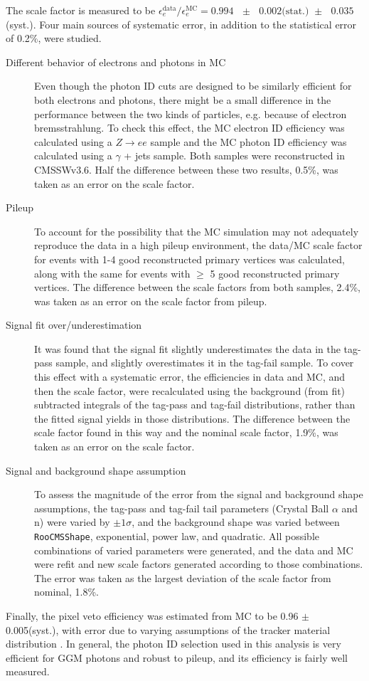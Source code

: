\documentclass[dissertation.tex]{subfiles}
\begin{document}
\marginpar{\textcolor{blue}{Official result uses this syst. error, so I am not rechecking it}}The scale factor is measured to be $\epsilon_{e}^{\mathrm{data}}/\epsilon_{e}^{\mathrm{MC}} = 0.994\mbox{ }\pm\mbox{ }0.002\mbox{(stat.) }\pm\mbox{ }0.035$(syst.).  Four main sources of systematic error, in addition to the statistical error of 0.2\%, were studied.

\begin{description}
  \item[Different behavior of electrons and photons in MC] Even though the photon ID cuts are designed to be similarly efficient for both electrons and photons, there might be a small difference in the performance between the two kinds of particles, e.g. because of electron bremsstrahlung.  To check this effect, the MC electron ID efficiency was calculated using a $Z\rightarrow ee$ sample and the MC photon ID efficiency was calculated using a $\gamma$ + jets sample.  Both samples were reconstructed in CMSSWv3.6.  Half the difference between these two results, 0.5\%, was taken as an error on the scale factor.
  \item[Pileup] \marginpar{\textcolor{blue}{Corrected some of these bullets}}To account for the possibility that the MC simulation may not adequately reproduce the data in a high pileup environment, the data/MC scale factor for events with 1-4 good reconstructed primary vertices was calculated, along with the same for events with $\geq$ 5 good reconstructed primary vertices.  The difference between the scale factors from both samples, 2.4\%, was taken as an error on the scale factor from pileup.
  \item[Signal fit over/underestimation] It was found that the signal fit slightly underestimates the data in the tag-pass sample, and slightly overestimates it in the tag-fail sample.  To cover this effect with a systematic error, the efficiencies in data and MC, and then the scale factor, were recalculated using the background (from fit) subtracted integrals of the tag-pass and tag-fail distributions, rather than the fitted signal yields in those distributions.  The difference between the scale factor found in this way and the nominal scale factor, 1.9\%, was taken as an error on the scale factor.
  \item[Signal and background shape assumption] To assess the magnitude of the error from the signal and background shape assumptions, the tag-pass and tag-fail tail parameters (Crystal Ball $\alpha$ and n) were varied by $\pm1\sigma$, and the background shape was varied between \verb+RooCMSShape+, exponential, power law, and quadratic.  All possible combinations of varied parameters were generated, and the data and MC were refit and new scale factors generated according to those combinations.  The error was taken as the largest deviation of the scale factor from nominal, 1.8\%.
\end{description}

Finally, the pixel veto efficiency was estimated from MC to be 0.96 $\pm$ 0.005(syst.), with error due to varying assumptions of the tracker material distribution \cite{CMS_AN-2010/271}.  In general, the photon ID selection used in this analysis is very efficient for GGM photons and robust to pileup, and its efficiency is fairly well measured.
\end{document}

